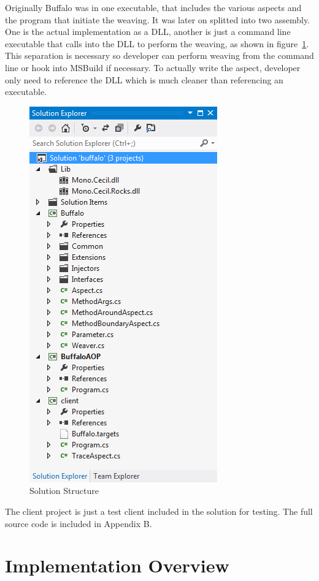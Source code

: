Originally Buffalo was in one executable, that includes the various aspects and the program that initiate the weaving. It was later on splitted into two assembly. One is the actual implementation as a DLL, another is just a command line executable that calls into the DLL to perform the weaving, as shown in figure~\ref{solutionexplorer}. This separation is necessary so developer can perform weaving from the command line or hook into MSBuild if necessary. To actually write the aspect, developer only need to reference the DLL which is much cleaner than referencing an executable.

\begin{figure}[H]
  \includegraphics[scale=1.0]{SolutionExplorer.PNG}
  \centering
  \caption{Solution Structure\label{solutionexplorer}}
\end{figure}

The client project is just a test client included in the solution for testing. The full source code is included in Appendix B.

\section{Implementation Overview}


